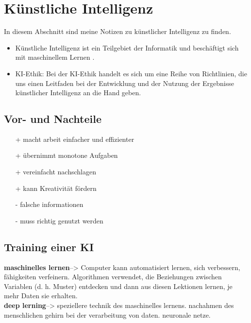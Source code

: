 \section{Künstliche Intelligenz}
\label{sec:ai}

In diesem Abschnitt sind meine Notizen zu künstlicher Intelligenz zu finden.

\begin{itemize}
    \item Künstliche Intelligenz ist ein Teilgebiet der Informatik und beschäftigt sich mit maschinellem Lernen \citep{ai-wikipedia}.
    \item KI-Ethik: Bei der KI-Ethik handelt es sich um eine Reihe von Richtlinien, die uns einen Leitfaden bei der Entwicklung und der Nutzung der Ergebnisse künstlicher Intelligenz an die Hand geben. \citep{ibm}
\end{itemize}

\subsection{Vor- und Nachteile} \citep{GitHub}
\begin{itemize}
    \item[+] macht arbeit einfacher und effizienter
    \item[+] übernimmt monotone Aufgaben
    \item[+] vereinfacht nachschlagen
    \item[+] kann Kreativität fördern
    \item[-] falsche informationen
    \item[-] muss richtig genutzt werden
\end{itemize}

\bigskip

\subsection{Training einer KI } \citep{KI-Training}
\textbf{maschinelles lernen}--> Computer kann automatisiert lernen, sich verbessern, fähigkeiten verfeinern.
Algorithmen verwendet, die Beziehungen zwischen Variablen (d. h. Muster) entdecken und dann aus diesen Lektionen lernen, je mehr Daten sie erhalten.\\
\textbf{deep lerning}--> speziellere technik des maschinelles lernens. nachahmen des menschlichen gehirn bei der verarbeitung von daten. neuronale netze.\\


